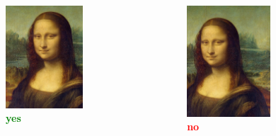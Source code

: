 \documentclass[hyperref={pdfpagelabels=false},aspectratio=169]{beamer}
\begin{document}
\begin{frame}
	\begin{columns}[T,onlytextwidth]
	\begin{figure} 
		\centering
		\def\svgwidth{1\textwidth}
		\includegraphics[width=0.7\textwidth]{in_bild_gucken.jpg} \\
		\textcolor{green}{\textbf{yes}}	
	\end{figure}
	\begin{figure} 
		\centering
		\def\svgwidth{1\textwidth}
		\includegraphics[width=0.7\textwidth]{aus_bild_gucken.jpg} \\
		\textcolor{red}{\textbf{no}}	
	\end{figure}
\end{columns}
\end{frame}
\end{document}
